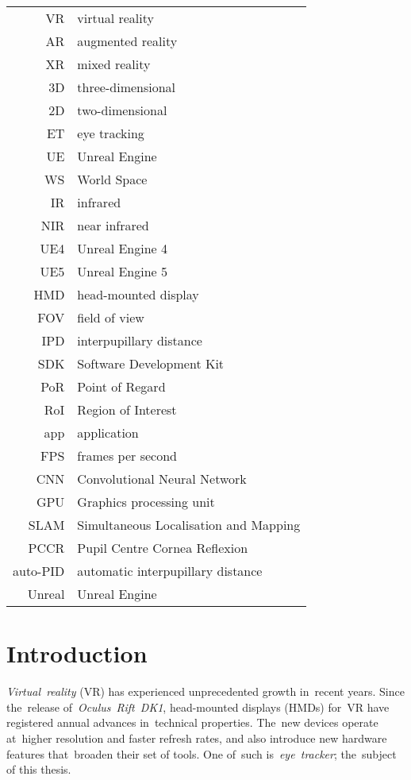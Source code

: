 \documentclass[english,bachelor,unicode]{ctufit-thesis}
\theoremstyle{plain}
\theoremstyle{definition}
\theoremstyle{remark}
\numberwithin{theorem}{chapter}
\begin{document}
\begin{tabular}{rl}
VR & virtual reality \\
AR & augmented reality \\
XR & mixed reality \\
3D & three-dimensional \\ 
2D & two-dimensional \\
ET & eye tracking \\
UE & Unreal Engine \\
WS & World Space \\
IR & infrared \\
NIR & near infrared \\
UE4 & Unreal Engine 4 \\
UE5 & Unreal Engine 5 \\
HMD & head-mounted display \\
FOV & field of view \\
IPD & interpupillary distance \\
SDK & Software Development Kit \\
PoR & Point of Regard \\
RoI & Region of Interest \\
app & application \\
FPS & frames per second \\
CNN & Convolutional Neural Network \\
GPU & Graphics processing unit \\
SLAM & Simultaneous Localisation and Mapping \\
PCCR & Pupil Centre Cornea Reflexion \\
auto-PID & automatic interpupillary distance \\
Unreal & Unreal Engine \\
\end{tabular}

\mainmatter\mainmatterinit %



\chapter{Introduction}
\emph{Virtual~reality} (VR) has experienced unprecedented growth in~recent years. Since the~release of~\emph{Oculus~Rift~DK1}, head-mounted displays (HMDs) for~VR have registered annual advances in~technical properties. The~new devices operate at~higher resolution and faster refresh rates, and also introduce new hardware features that~broaden their set of tools. One of~such is~\emph{eye~tracker}; the~subject of this thesis.
\end{document}
